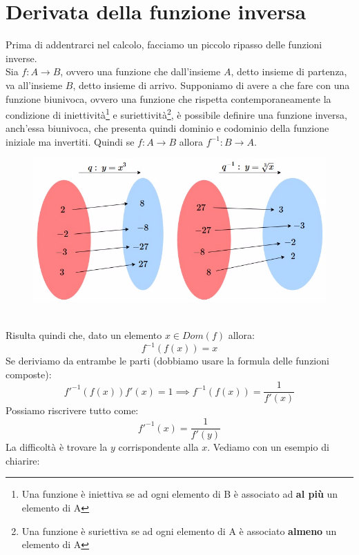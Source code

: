 \documentclass{report}
\begin{document}
\section{Derivata della funzione inversa}
Prima di addentrarci nel calcolo, facciamo un piccolo ripasso delle funzioni inverse. \\
Sia $f:A \to B$, ovvero una funzione che dall'insieme $A$, detto insieme di partenza, va all'insieme $B$, detto insieme di arrivo. Supponiamo di avere a che fare con una funzione biunivoca, ovvero una funzione che rispetta contemporaneamente la condizione di iniettività\footnote{Una funzione è iniettiva se ad ogni elemento di B è associato ad \textbf{al più} un elemento di A} e suriettività\footnote{Una funzione è suriettiva se ad ogni elemento di A è associato \textbf{almeno} un elemento di A}, è possibile definire una funzione inversa, anch'essa biunivoca, che presenta quindi dominio e codominio della funzione iniziale ma invertiti. Quindi se $f: A \to B$ allora $f^{-1}:B \to A$.
\begin{figure}[h!]
	\includegraphics[width=\textwidth]{function.png}
\end{figure}
\\
Risulta quindi che, dato un elemento $x \in Dom(f)$ allora:
$$
	f^{-1}(f(x)) = x
$$
Se deriviamo da entrambe le parti (dobbiamo usare la formula delle funzioni composte):
$$
	f'^{-1}(f(x))f'(x) = 1 \implies f^{-1}(f(x))=\frac{1}{f'(x)}
$$
Possiamo riscrivere tutto come:
$$
	f'^{-1}(x) = \frac{1}{f'(y)}
$$
La difficoltà è trovare la $y$ corrispondente alla $x$. Vediamo con un esempio di chiarire:
\end{document}
